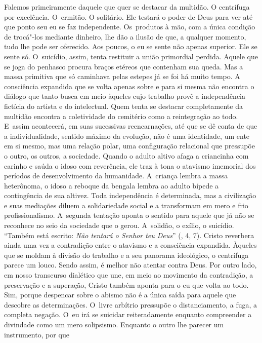 Falemos primeiramente daquele que quer se destacar da multidão. O
centrífuga por excelência. O~ermitão. O solitário. Ele testará o poder
de Deus para ver até que ponto seu eu se faz independente. Os~produtos à
mão, com a única condição de trocá"-los mediante dinheiro, lhe dão a
ilusão de que, a qualquer momento, tudo lhe pode ser oferecido. Aos
poucos, o eu se sente não apenas superior. Ele se sente só. O~suicídio,
assim, tenta restituir a união primordial perdida. Aquele que se joga do
penhasco procura braços etéreos que contenham sua queda. Mas a massa
primitiva que só caminhava pelas estepes já se foi há muito tempo. A
consciência expandida que se volta apenas sobre e para si mesma não
encontra o diálogo que tanto busca em meio àqueles cujo trabalho provê a
independência fictícia do artista e do intelectual. Quem tenta se
destacar completamente da multidão encontra a coletividade do cemitério
como a reintegração ao todo. E~assim acontecerá, em suas sucessivas
reencarnações, até que se dê conta de que a individualidade, sentido
máximo da evolução, não é uma identidade, um ente em si mesmo, mas uma
relação polar, uma configuração relacional que pressupõe o outro, os
outros, a sociedade. Quando o adulto altivo afaga a criancinha com
carinho e saúda o idoso com reverência, ele traz à tona o atavismo
imemorial dos períodos de desenvolvimento da humanidade. A~criança
lembra a massa heterônoma, o idoso a reboque da bengala lembra ao adulto
bípede a contingência de sua altivez. Toda independência é determinada,
mas a civilização e suas mediações diluem a solidariedade social e a
transformam em mero e frio profissionalismo. A~segunda tentação aponta o
sentido para aquele que já não se reconhece no seio da sociedade que o
gerou. A~solidão, o exílio, o suicídio. ``Também está escrito: \emph{Não
tentará o Senhor teu Deus}'' (, 4, 7). Cristo reverbera ainda uma
vez a contradição entre o atavismo e a consciência expandida. Àqueles
que se moldam à divisão do trabalho e a seu panorama ideológico, o
centrífuga parece um louco. Sendo assim, é melhor não atentar contra
Deus. Por outro lado, em nosso transcurso dialético que une, em meio ao
movimento da contradição, a preservação e a superação, Cristo também
aponta para o eu que volta ao todo. Sim, porque despencar sobre o abismo
não é a única saída para aquele que descobre as determinações. O~livre
arbítrio pressupõe o distanciamento, a fuga, a completa negação. O~eu
irá se suicidar reiteradamente enquanto compreender a divindade como um
mero solipsismo. Enquanto o outro lhe parecer um instrumento, por que
